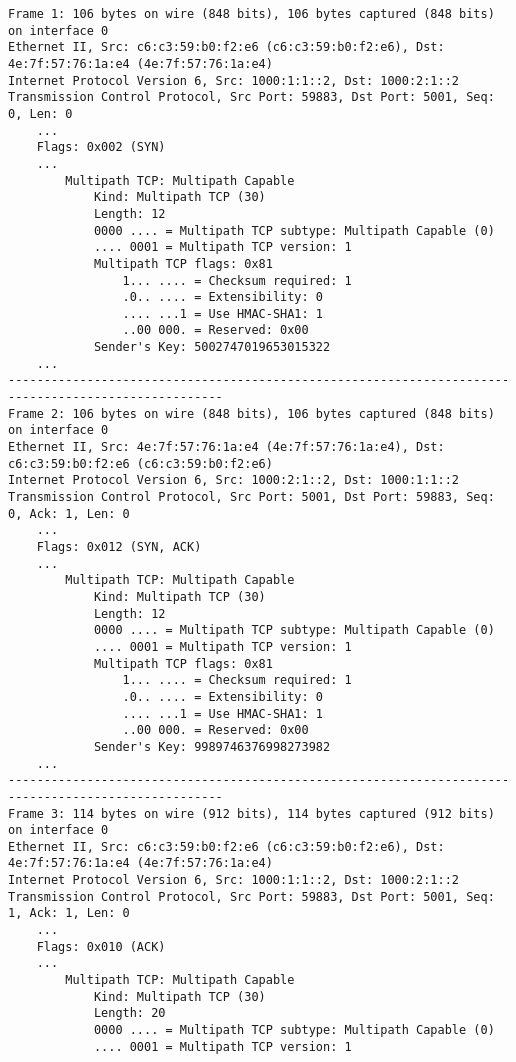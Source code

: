 \begingroup
    \fontsize{8pt}{9pt}\selectfont
	\begin{verbatim}
Frame 1: 106 bytes on wire (848 bits), 106 bytes captured (848 bits) on interface 0
Ethernet II, Src: c6:c3:59:b0:f2:e6 (c6:c3:59:b0:f2:e6), Dst: 4e:7f:57:76:1a:e4 (4e:7f:57:76:1a:e4)
Internet Protocol Version 6, Src: 1000:1:1::2, Dst: 1000:2:1::2
Transmission Control Protocol, Src Port: 59883, Dst Port: 5001, Seq: 0, Len: 0
    ...
    Flags: 0x002 (SYN)
    ...
        Multipath TCP: Multipath Capable
            Kind: Multipath TCP (30)
            Length: 12
            0000 .... = Multipath TCP subtype: Multipath Capable (0)
            .... 0001 = Multipath TCP version: 1
            Multipath TCP flags: 0x81
                1... .... = Checksum required: 1
                .0.. .... = Extensibility: 0
                .... ...1 = Use HMAC-SHA1: 1
                ..00 000. = Reserved: 0x00
            Sender's Key: 5002747019653015322
    ...
----------------------------------------------------------------------------------------------------
Frame 2: 106 bytes on wire (848 bits), 106 bytes captured (848 bits) on interface 0
Ethernet II, Src: 4e:7f:57:76:1a:e4 (4e:7f:57:76:1a:e4), Dst: c6:c3:59:b0:f2:e6 (c6:c3:59:b0:f2:e6)
Internet Protocol Version 6, Src: 1000:2:1::2, Dst: 1000:1:1::2
Transmission Control Protocol, Src Port: 5001, Dst Port: 59883, Seq: 0, Ack: 1, Len: 0
    ...
    Flags: 0x012 (SYN, ACK)
    ...
        Multipath TCP: Multipath Capable
            Kind: Multipath TCP (30)
            Length: 12
            0000 .... = Multipath TCP subtype: Multipath Capable (0)
            .... 0001 = Multipath TCP version: 1
            Multipath TCP flags: 0x81
                1... .... = Checksum required: 1
                .0.. .... = Extensibility: 0
                .... ...1 = Use HMAC-SHA1: 1
                ..00 000. = Reserved: 0x00
            Sender's Key: 9989746376998273982
    ...
----------------------------------------------------------------------------------------------------
Frame 3: 114 bytes on wire (912 bits), 114 bytes captured (912 bits) on interface 0
Ethernet II, Src: c6:c3:59:b0:f2:e6 (c6:c3:59:b0:f2:e6), Dst: 4e:7f:57:76:1a:e4 (4e:7f:57:76:1a:e4)
Internet Protocol Version 6, Src: 1000:1:1::2, Dst: 1000:2:1::2
Transmission Control Protocol, Src Port: 59883, Dst Port: 5001, Seq: 1, Ack: 1, Len: 0
    ...
    Flags: 0x010 (ACK)
    ...
        Multipath TCP: Multipath Capable
            Kind: Multipath TCP (30)
            Length: 20
            0000 .... = Multipath TCP subtype: Multipath Capable (0)
            .... 0001 = Multipath TCP version: 1

\end{verbatim}
